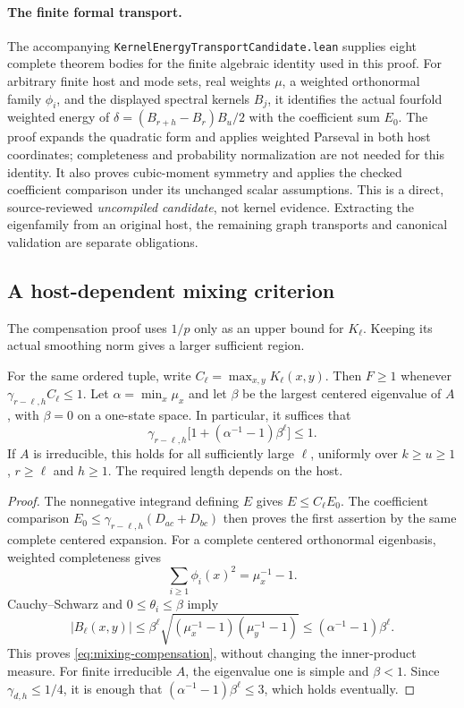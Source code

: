 \paragraph{The finite formal transport.}
The accompanying \texttt{KernelEnergyTransportCandidate.lean} supplies eight
complete theorem bodies for the finite algebraic identity used in this proof.
For arbitrary finite host and mode sets, real weights $\mu$, a weighted
orthonormal family $\phi_i$, and the displayed spectral kernels $B_j$, it
identifies the actual fourfold weighted energy of
$\delta=(B_{r+h}-B_r)B_u/2$ with the coefficient sum $E_0$.
The proof expands the quadratic form and applies weighted Parseval in both
host coordinates; completeness and probability normalization are not needed
for this identity.  It also proves cubic-moment symmetry and applies the
checked coefficient comparison under its unchanged scalar assumptions.
This is a direct, source-reviewed \emph{uncompiled candidate}, not kernel
evidence.  Extracting the eigenfamily from an original host, the remaining
graph transports and canonical validation are separate obligations.

\subsection{A host-dependent mixing criterion}

The compensation proof uses $1/p$ only as an upper bound for $K_\ell$.
Keeping its actual smoothing norm gives a larger sufficient region.

\begin{proposition}
For the same ordered tuple, write $C_\ell=\max_{x,y}K_\ell(x,y)$.
Then $F\geq1$ whenever $\gamma_{r-\ell,h}C_\ell\leq1$.
Let $\alpha=\min_x\mu_x$ and let $\beta$ be the largest centered eigenvalue
of $A$, with $\beta=0$ on a one-state space.  In particular, it suffices that
\begin{equation}
 \gamma_{r-\ell,h}\bigl[1+(\alpha^{-1}-1)\beta^\ell\bigr]\leq1.
 \label{eq:mixing-compensation}
\end{equation}
If $A$ is irreducible, this holds for all sufficiently large $\ell$,
uniformly over $k\geq u\geq1$, $r\geq\ell$ and $h\geq1$.
The required length depends on the host.
\end{proposition}

\begin{proof}
The nonnegative integrand defining $E$ gives $E\leq C_\ell E_0$.
The coefficient comparison $E_0\leq\gamma_{r-\ell,h}(D_{ac}+D_{bc})$
then proves the first assertion by the same complete centered expansion.
For a complete centered orthonormal eigenbasis, weighted completeness gives
\[
 \sum_{i\geq1}\phi_i(x)^2=\mu_x^{-1}-1.
\]
Cauchy--Schwarz and $0\leq\theta_i\leq\beta$ imply
\[
 |B_\ell(x,y)|\leq\beta^\ell
 \sqrt{(\mu_x^{-1}-1)(\mu_y^{-1}-1)}
 \leq(\alpha^{-1}-1)\beta^\ell.
\]
This proves \eqref{eq:mixing-compensation}, without changing the
inner-product measure.  For finite irreducible $A$, the eigenvalue one
is simple and $\beta<1$.  Since $\gamma_{d,h}\leq1/4$, it is enough that
$(\alpha^{-1}-1)\beta^\ell\leq3$, which holds eventually.
\end{proof}


